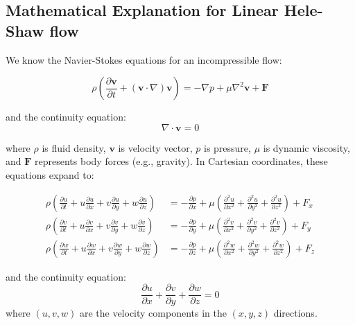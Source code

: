 \documentclass[12pt,a4paper]{article}
\begin{document}
\subsection{Mathematical Explanation for Linear Hele-Shaw flow}

We know the Navier-Stokes equations for an incompressible flow:
\begin{mdframed}[linewidth=0.5pt]
\begin{equation}
\rho \left( \frac{\partial \mathbf{v}}{\partial t} + (\mathbf{v} \cdot \nabla) \mathbf{v} \right) = -\nabla p + \mu \nabla^2 \mathbf{v} + \mathbf{F}
\end{equation}
\end{mdframed}
and the continuity equation:
\begin{equation}
\nabla \cdot \mathbf{v} = 0
\end{equation}

where $\rho$ is fluid density, $\mathbf{v}$ is velocity vector, $p$ is pressure, $\mu$ is dynamic viscosity, and $\mathbf{F}$ represents body forces (e.g., gravity).
In Cartesian coordinates, these equations expand to:


\begin{align}
\rho \left( \frac{\partial u}{\partial t} + u\frac{\partial u}{\partial x} + v\frac{\partial u}{\partial y} + w\frac{\partial u}{\partial z} \right) &= -\frac{\partial p}{\partial x} + \mu \left( \frac{\partial^2 u}{\partial x^2} + \frac{\partial^2 u}{\partial y^2} + \frac{\partial^2 u}{\partial z^2} \right) + F_x \\
\rho \left( \frac{\partial v}{\partial t} + u\frac{\partial v}{\partial x} + v\frac{\partial v}{\partial y} + w\frac{\partial v}{\partial z} \right) &= -\frac{\partial p}{\partial y} + \mu \left( \frac{\partial^2 v}{\partial x^2} + \frac{\partial^2 v}{\partial y^2} + \frac{\partial^2 v}{\partial z^2} \right) + F_y \\
\rho \left( \frac{\partial w}{\partial t} + u\frac{\partial w}{\partial x} + v\frac{\partial w}{\partial y} + w\frac{\partial w}{\partial z} \right) &= -\frac{\partial p}{\partial z} + \mu \left( \frac{\partial^2 w}{\partial x^2} + \frac{\partial^2 w}{\partial y^2} + \frac{\partial^2 w}{\partial z^2} \right) + F_z
\end{align}



and the continuity equation:
\begin{equation}
\frac{\partial u}{\partial x} + \frac{\partial v}{\partial y} + \frac{\partial w}{\partial z} = 0
\end{equation}
where $(u, v, w)$ are the velocity components in the $(x, y, z)$ directions.
\end{document}
